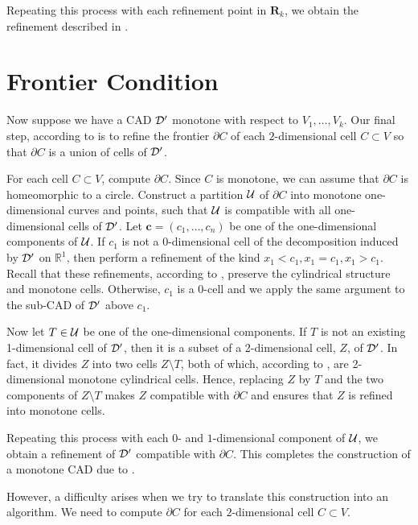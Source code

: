 \documentclass[
]{book}
\theoremstyle{definition}
\theoremstyle{definition}
\theoremstyle{definition}
\theoremstyle{definition}
\theoremstyle{remark}
\begin{document}
Repeating this process with each refinement point in \(\mathbf{R}_k\), we obtain the refinement described in \citep[Lemma 3.11]{bgv15}.

\hypertarget{frontier-condition}{%
\chapter{Frontier Condition}\label{frontier-condition}}

Now suppose we have a CAD \(\cal D'\) monotone with respect to \(V_1,\ldots,V_k\). Our final step, according to \citep[Theorem 3.20]{bgv15} is to refine the frontier \(\partial C\) of each \(2\)-dimensional cell \(C \subset V\) so that \(\partial C\) is a union of cells of \(\cal D'\).

For each cell \(C \subset V\), compute \(\partial C\). Since \(C\) is monotone, we can assume that \(\partial C\) is homeomorphic to a circle. Construct a partition \(\cal U\) of \(\partial C\) into monotone one-dimensional curves and points, such that \(\cal U\) is compatible with all one-dimensional cells of \(\cal D'\).
Let \(\mathbf{c} = (c_1,\ldots,c_n)\) be one of the one-dimensional components of \(\cal U\). If \(c_1\) is not a \(0\)-dimensional cell of the decomposition induced by \(\cal D'\) on \(\mathbb{R}^1\), then perform a refinement of the kind \(x_1 < c_1, x_1 = c_1, x_1 > c_1\). Recall that these refinements, according to \citep[Lemma 3,11]{bgv15}, preserve the cylindrical structure and monotone cells. Otherwise, \(c_1\) is a \(0\)-cell and we apply the same argument to the sub-CAD of \(\cal D'\) above \(c_1\).

Now let \(T \in {\cal U}\) be one of the one-dimensional components. If \(T\) is not an existing 1-dimensional cell of \(\cal D'\), then it is a subset of a 2-dimensional cell, \(Z\), of \(\cal D'\). In fact, it divides \(Z\) into two cells \(Z \setminus T\), both of which, according to \citep[Theorem 11]{bgv13}, are 2-dimensional monotone cylindrical cells. Hence, replacing \(Z\) by \(T\) and the two components of \(Z \setminus T\) makes \(Z\) compatible with \(\partial C\) and ensures that \(Z\) is refined into monotone cells.

Repeating this process with each \(0\)- and \(1\)-dimensional component of \(\cal U\), we obtain a refinement of \(\cal D'\) compatible with \(\partial C\).
This completes the construction of a monotone CAD due to \citet{bgv15}.

However, a difficulty arises when we try to translate this construction into an algorithm. We need to compute \(\partial C\) for each \(2\)-dimensional cell \(C \subset V\).
\end{document}
